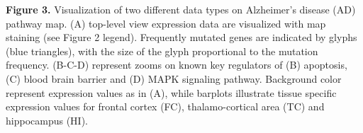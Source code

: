\documentclass[a4,center,fleqn]{NAR}
\begin{document}
\textbf{Figure 3.} Visualization of two different data types on Alzheimer's
disease (AD) pathway map.  (A) top-level view expression data are visualized with
map staining (see Figure 2 legend). Frequently mutated genes are indicated by
glyphs (blue triangles), with the size of the glyph proportional to the
mutation frequency. (B-C-D) represent zooms on known key regulators of (B)
apoptosis, (C) blood brain barrier and (D) MAPK signaling pathway. Background
color represent expression values as in (A), while barplots illustrate tissue
specific expression values for frontal cortex (FC), thalamo-cortical area (TC)
and hippocampus (HI).


\end{document}
